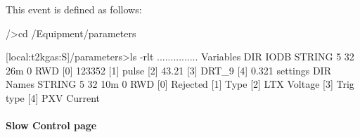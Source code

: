 This event is defined as follows:


\begin{DoxyCode}
/>cd /Equipment/parameters

[local:t2kgas:S]/parameters>ls  -rlt
    ...............
    Variables                   DIR
        IODB                    STRING  5     32    26m  0   RWD
                                        [0]             123352
                                        [1]             pulse
                                        [2]             43.21
                                        [3]             DRT_9
                                        [4]             0.321
    settings                    DIR
        Names                   STRING  5     32    10m  0   RWD
                                        [0]             Rejected
                                        [1]             Type
                                        [2]             LTX Voltage
                                        [3]             Trig type
                                        [4]             PXV Current
\end{DoxyCode}
 \par




\par
 \label{index_end}
\hypertarget{index_end}{}
 \paragraph{Slow Control page}\label{RC_mhttpd_sc_page}
\label{RC_mhttpd_sc_page_idx_mhttpd_page_slow-control}
\hypertarget{RC_mhttpd_sc_page_idx_mhttpd_page_slow-control}{}
 \par




